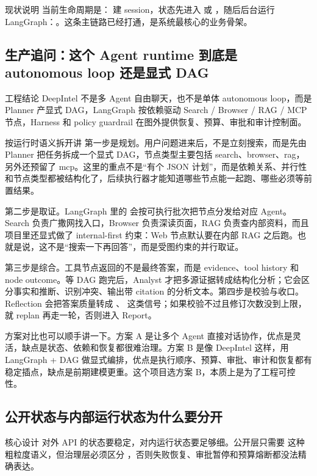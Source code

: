\documentclass[12pt]{article}
\begin{document}
\begin{summaryBox}{现状说明}
当前生命周期是： 建 session，状态先进入  或 ，随后后台运行 LangGraph：。这条主链路已经打通，是系统最核心的业务骨架。
\end{summaryBox}

\subsection{生产追问：这个 Agent runtime 到底是 autonomous loop 还是显式 DAG}
\begin{qaBox}{工程结论}
DeepIntel 不是多 Agent 自由聊天，也不是单体 autonomous loop，而是 Planner 产显式 DAG，LangGraph 按依赖驱动 Search / Browser / RAG / MCP 节点，Harness 和 policy guardrail 在图外提供恢复、预算、审批和审计控制面。
\end{qaBox}

\begin{analysisBox}{按运行时语义拆开讲}
第一步是规划。用户问题进来后，不是立刻搜索，而是先由 Planner 把任务拆成一个显式 DAG，节点类型主要包括 search、browser、rag，另外还预留了 mcp。这里的重点不是“有个 JSON 计划”，而是依赖关系、并行性和节点类型都被结构化了，后续执行器才能知道哪些节点能一起跑、哪些必须等前置结果。

第二步是取证。LangGraph 里的  会按可执行批次把节点分发给对应 Agent。Search 负责广撒网找入口，Browser 负责深读页面，RAG 负责查内部资料，而且项目里还显式做了 internal-first 约束：Web 节点默认要在内部 RAG 之后跑。也就是说，这不是“搜索一下再回答”，而是受图约束的并行取证。

第三步是综合。工具节点返回的不是最终答案，而是 evidence、tool history 和 node outcome。等 DAG 跑完后，Analyst 才把多源证据转成结构化分析；它会区分事实和推断、识别冲突、输出带 citation 的分析文本。第四步是校验与收口。Reflection 会把答案质量转成 、 这类信号；如果校验不过且修订次数没到上限，就 replan 再走一轮，否则进入 Report。

方案对比也可以顺手讲一下。方案 A 是让多个 Agent 直接对话协作，优点是灵活，缺点是状态、依赖和恢复都很难治理。方案 B 是像 DeepIntel 这样，用 LangGraph + DAG 做显式编排，优点是执行顺序、预算、审批、审计和恢复都有稳定插点，缺点是前期建模更重。这个项目选方案 B，本质上是为了工程可控性。
\end{analysisBox}

\subsection{公开状态与内部运行状态为什么要分开}
\begin{qaBox}{核心设计}
对外 API 的状态要稳定，对内运行状态要足够细。公开层只需要  这种粗粒度语义，但治理层必须区分 ，否则失败恢复、审批暂停和预算熔断都没法精确表达。
\end{qaBox}
\end{document}
